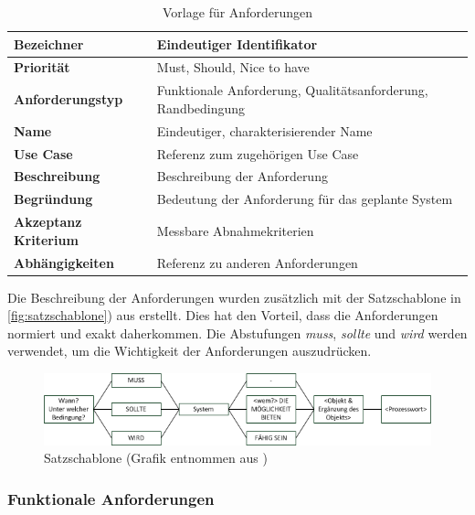 \begin{table}[ht]
\centering
  \begin{tabular}{ l | p{8cm} }
	\hline
	\rowcolor{gray}
	\textbf{Bezeichner}&	\textbf{Eindeutiger Identifikator}\\ \hline
	\textbf{Priorität} 		&	Must, Should, Nice to have\\ \hline
	\textbf{Anforderungstyp}	&	Funktionale Anforderung, Qualitätsanforderung, Randbedingung\\ \hline
	\textbf{Name} 			&	Eindeutiger, charakterisierender Name\\ \hline
	\textbf{Use Case} 		&	Referenz zum zugehörigen Use Case\\ \hline
	\textbf{Beschreibung} 	&	Beschreibung der Anforderung\\ \hline
	\textbf{Begründung} 		&	Bedeutung der Anforderung für das geplante System\\ \hline
	\textbf{Akzeptanz Kriterium}	&	Messbare Abnahmekriterien\\ \hline
	\textbf{Abhängigkeiten} 	&	Referenz zu anderen Anforderungen\\ \hline
  \end{tabular}
   \caption{Vorlage für Anforderungen}\label{table:req_template}
\end{table}


Die Beschreibung der Anforderungen wurden zusätzlich mit der Satzschablone in \autoref{fig:satzschablone}) aus \cite{req_eng_book} erstellt. Dies hat den Vorteil, dass die 
Anforderungen normiert und exakt daherkommen. Die Abstufungen \textit{muss}, \textit{sollte} und \textit{wird} werden verwendet, um die Wichtigkeit der Anforderungen auszudrücken.
\begin{figure}[h]
\includegraphics[scale=0.95]{images/anforderungen/satzschablone.png}
\caption[Satzschablone]{Satzschablone (Grafik entnommen aus \cite{req_eng_book})}
\label{fig:satzschablone}
\end{figure}


\newpage
\FloatBarrier
\subsubsection{Funktionale Anforderungen}\label{func_anforderungen}

